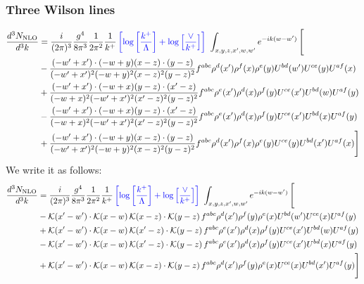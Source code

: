 \documentclass[aps,prd,amsmath,amssymb,nofootinbib]{revtex4-2}
\numberwithin{equation}{section}
\begin{document}
\subsubsection{Three Wilson lines}
\begin{align}
      \frac{d^{3}N_{\rm NLO}}{d^{3}k} & = \frac{i}{(2\pi)^{3}}\frac{g^{4}}{8\pi^{3}}\frac{1}{2\pi^{2}} \frac{1}{k^{+}}\,{\color{blue}\left[\log{\left[\frac{k^{+}}{\Lambda}\right]}+\log{\left[\frac{\vee}{k^{+}}\right]}\right]}\,\,\int_{x,y,z,x^{\prime},w,w^{\prime}}e^{-ik(w-w^{\prime})}\, \Bigg[\notag \\ & -  \frac{( - w' + x') \cdot ( - w + y) (x - z) \cdot (y - z)}{( - w' + x')^{2} ( - w + y)^{2} (x - z)^{2} (y - z)^{2}} f^{a b c} \rho^{d}(x') \rho^{f}(x) \rho^{e}(y) U^{bd}(w') U^{ce}(y) U^{a f}(x)\nonumber\\
    &+  \frac{( - w' + x') \cdot ( - w + x) (y - z) \cdot (x' - z)}{( - w + x)^{2} ( - w' + x')^{2} (x' - z)^{2} (y - z)^{2}} f^{a b c} \rho^{e}(x') \rho^{d}(x) \rho^{f}(y) U^{ce}(x') U^{bd}(w) U^{a f}(y)\nonumber\\
    &- \frac{( - w' + x') \cdot ( - w + x) (y - z) \cdot (x' - z)}{( - w + x)^{2} ( - w' + x')^{2} (x' - z)^{2} (y - z)^{2}} f^{a b c} \rho^{e}(x') \rho^{d}(x) \rho^{f}(y) U^{ce}(x') U^{b d}(x) U^{a f}(y)\nonumber\\
    &+  \frac{( - w' + x') \cdot ( - w + y) (x - z) \cdot (y - z)}{( - w' + x')^{2} ( - w + y)^{2} (x - z)^{2} (y - z)^{2}} f^{a b c} \rho^{d}(x') \rho^{f}(x) \rho^{e}(y) U^{ce}(y) U^{b d}(x') U^{a f}(x) \Bigg]
\end{align}
We write it as follows:
\begin{align}
      \frac{d^{3}N_{\rm NLO}}{d^{3}k} & = \frac{i}{(2\pi)^{3}}\frac{g^{4}}{8\pi^{3}}\frac{1}{2\pi^{2}} \frac{1}{k^{+}}\,{\color{blue}\left[\log{\left[\frac{k^{+}}{\Lambda}\right]}+\log{\left[\frac{\vee}{k^{+}}\right]}\right]}\,\,\int_{x,y,z,x^{\prime},w,w^{\prime}}e^{-ik(w-w^{\prime})}\, \Bigg[\notag \\ & - \mathcal{K}(x'-w')\cdot \mathcal{K}(x-w)\, \mathcal{K}(x-z)\cdot \mathcal{K}(y-z)\, f^{a b c} \rho^{d}(x') \rho^{f}(y) \rho^{e}(x) U^{bd}(w') U^{ce}(x) U^{a f}(y)\nonumber\\
    &+ \mathcal{K}(x'-w')\cdot \mathcal{K}(x-w)\,\mathcal{K}(x'-z)\cdot \mathcal{K}(y-z)\, f^{a b c} \rho^{e}(x') \rho^{d}(x) \rho^{f}(y) U^{ce}(x') U^{bd}(w) U^{a f}(y)\nonumber\\
    &- \mathcal{K}(x'-w')\cdot \mathcal{K}(x-w)\,\mathcal{K}(x'-z)\cdot \mathcal{K}(y-z)\, f^{a b c} \rho^{e}(x') \rho^{d}(x) \rho^{f}(y) U^{ce}(x') U^{b d}(x) U^{a f}(y)\nonumber\\
    &+  \mathcal{K}(x'-w')\cdot \mathcal{K}(x-w)\, \mathcal{K}(x-z)\cdot \mathcal{K}(y-z)\, f^{a b c} \rho^{d}(x') \rho^{f}(y) \rho^{e}(x) U^{ce}(x) U^{b d}(x') U^{a f}(y) \Bigg]
\end{align}
\end{document}
